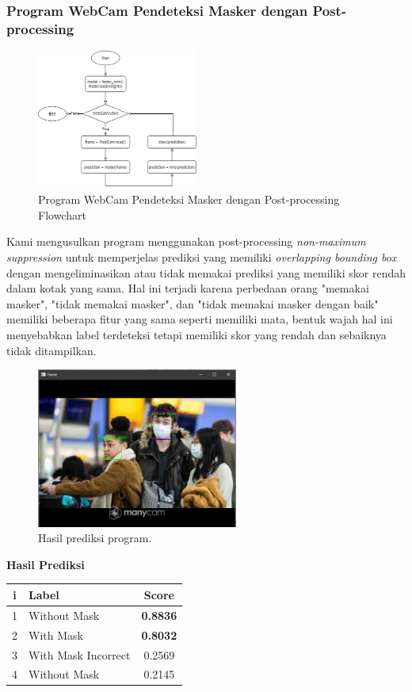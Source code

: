 \documentclass{article}
\begin{document}
  	\subsubsection{Program WebCam Pendeteksi Masker dengan Post-processing}
  	\begin{figure}[H]
  		\centering
  		\includegraphics[width=200px]{arsitektur/Sequential with Postprocessing.png}
  		\caption{Program WebCam Pendeteksi Masker dengan Post-processing Flowchart}
	\end{figure}
	
	Kami mengusulkan program menggunakan post-processing \textit{non-maximum suppression} untuk memperjelas prediksi yang memiliki \textit{overlapping bounding box} dengan mengeliminasikan atau tidak memakai prediksi yang memiliki skor rendah dalam kotak yang sama. Hal ini terjadi karena perbedaan orang "memakai masker", "tidak memakai masker", dan "tidak memakai masker dengan baik" memiliki beberapa fitur yang sama seperti memiliki mata, bentuk wajah hal ini menyebabkan label terdeteksi tetapi memiliki skor yang rendah dan sebaiknya tidak ditampilkan.\\

	\begin{figure}[H]
		\centering
		\includegraphics[width=250px]{../demo/Results/implementation/raw_prediction_nms0_labeled.png}
		\caption{Hasil prediksi program.}
	\end{figure}
	{\large{\textbf{Hasil Prediksi}}}
	\begin{table}[H]
		\centering
		\begin{tabular}{clc}
		\hline
		\textbf{i} & \textbf{Label}               & \textbf{Score}  \\ \hline
		1 & Without Mask        & \textbf{0.8836} \\
		2 & With Mask           & \textbf{0.8032} \\
		3 & With Mask Incorrect & 0.2569 \\
		4 & Without Mask        & 0.2145
		\end{tabular}
	\end{table}
	\newpage
	
\end{document}
